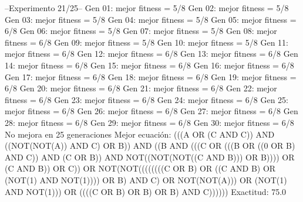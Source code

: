 --Experimento 
 21/25--
Gen 01: mejor fitness = 5/8
Gen 02: mejor fitness = 5/8
Gen 03: mejor fitness = 5/8
Gen 04: mejor fitness = 5/8
Gen 05: mejor fitness = 6/8
Gen 06: mejor fitness = 5/8
Gen 07: mejor fitness = 5/8
Gen 08: mejor fitness = 6/8
Gen 09: mejor fitness = 5/8
Gen 10: mejor fitness = 5/8
Gen 11: mejor fitness = 6/8
Gen 12: mejor fitness = 6/8
Gen 13: mejor fitness = 6/8
Gen 14: mejor fitness = 6/8
Gen 15: mejor fitness = 6/8
Gen 16: mejor fitness = 6/8
Gen 17: mejor fitness = 6/8
Gen 18: mejor fitness = 6/8
Gen 19: mejor fitness = 6/8
Gen 20: mejor fitness = 6/8
Gen 21: mejor fitness = 6/8
Gen 22: mejor fitness = 6/8
Gen 23: mejor fitness = 6/8
Gen 24: mejor fitness = 6/8
Gen 25: mejor fitness = 6/8
Gen 26: mejor fitness = 6/8
Gen 27: mejor fitness = 6/8
Gen 28: mejor fitness = 6/8
Gen 29: mejor fitness = 6/8
Gen 30: mejor fitness = 6/8
No mejora en 25 generaciones
Mejor ecuación: (((A OR (C AND C)) AND ((NOT(NOT(A)) AND C) OR B)) AND ((B AND (((C OR (((B OR ((0 OR B) AND C)) AND (C OR B)) AND NOT((NOT(NOT((C AND B))) OR B)))) OR (C AND B)) OR C)) OR NOT(NOT((((((((C OR B) OR ((C AND B) OR (NOT(1) AND NOT(1)))) OR B) AND C) OR NOT(NOT(A))) OR (NOT(1) AND NOT(1))) OR ((((C OR B) OR B) OR B) AND C))))))
 Exactitud: 75.0%


